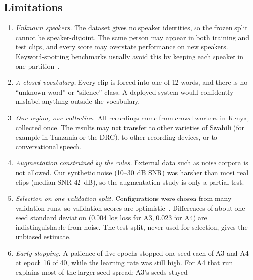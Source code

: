 \subsection{Limitations}
\label{sec:limitations}
\begin{enumerate}
  \item \emph{Unknown speakers.} The dataset gives no speaker identities, so the frozen split cannot be
        speaker-disjoint. The same person may appear in both training and test clips, and every score may overstate
        performance on new speakers. Keyword-spotting benchmarks usually avoid this by keeping each speaker in one
        partition~\cite{warden2018speech}.
  \item \emph{A closed vocabulary.} Every clip is forced into one of 12 words, and there is no ``unknown word'' or
        ``silence'' class. A deployed system would confidently mislabel anything outside the vocabulary.
  \item \emph{One region, one collection.} All recordings come from crowd-workers in Kenya, collected once. The
        results may not transfer to other varieties of Swahili (for example in Tanzania or the DRC), to other
        recording devices, or to conversational speech.
  \item \emph{Augmentation constrained by the rules.} External data such as noise corpora is not allowed. Our
        synthetic noise (10--30~dB SNR) was harsher than most real clips (median SNR 42~dB), so the augmentation
        study is only a partial test.
  \item \emph{Selection on one validation split.} Configurations were chosen from many validation runs, so
        validation scores are optimistic~\cite{cawley2010overfitting}. Differences of about one seed standard
        deviation (0.004 log loss for A3, 0.023 for A4) are indistinguishable from noise. The test split, never used
        for selection, gives the unbiased estimate.
  \item \emph{Early stopping.} A patience of five epochs stopped one seed each of A3 and A4 at epoch 16 of 40, while
        the learning rate was still high. For A4 that run explains most of the larger seed spread; A3's seeds stayed

\end{enumerate}
